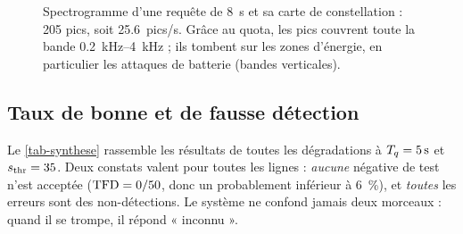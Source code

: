 \begin{figure}[t]
  \centering
  \caption{Spectrogramme d'une requête de \qty{8}{\second} et sa carte de constellation :
  205 pics, soit \num{25.6}~pics/s. Grâce au quota, les pics couvrent toute la bande
  \qtyrange{0.2}{4}{\kilo\hertz} ; ils tombent sur les zones d'énergie, en particulier les
  attaques de batterie (bandes verticales).}
  \label{fig-constellation}
\end{figure}

\subsection{Taux de bonne et de fausse détection}
\label{sec-tbd-tfd}

Le \cref{tab-synthese} rassemble les résultats de toutes les dégradations à
$T_q = \qty{5}{\second}$ et $s_{\mathrm{thr}} = 35$. Deux constats valent pour toutes les lignes :
\emph{aucune} négative de test n'est acceptée ($\mathrm{TFD} = 0/50$, donc un \TFD{} probablement
inférieur à \qty{6}{\percent}), et \emph{toutes} les erreurs sont des non-détections. Le
système ne confond jamais deux morceaux : quand il se trompe, il répond « inconnu ».

